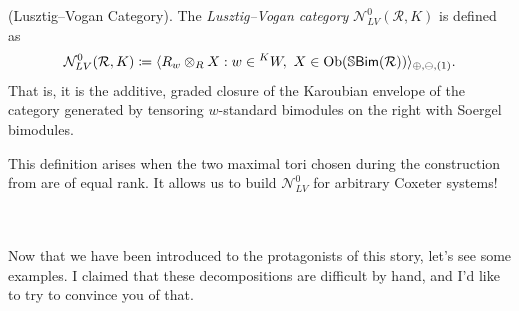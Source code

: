 \noindent\begin{definition}\textup{(Lusztig--Vogan Category).} The {\em Lusztig--Vogan category} $\mathcal{N}_{LV}^0(\mathcal{R}, K)$ is defined as
\begin{align*}
\begin{split}
\mathcal{N}_{LV}^0(\mathcal{R}, K) \coloneqq \langle R_w \otimes_R X : w \in {}^KW,\ X \in \textup{Ob}(\mathbb{S}\textup{\textsf{Bim}}(\mathcal{R}))\rangle_{\oplus,\ominus,(1)}.
\end{split}
\end{align*}
\noindent That is, it is the additive, graded closure of the Karoubian envelope of the category generated by tensoring $w$-standard bimodules on the right with Soergel bimodules.\\
\end{definition}

\noindent\begin{remark} This definition arises when the two maximal tori chosen during the construction from \cite{LR22} are of equal rank. It allows us to build $\mathcal{N}_{LV}^0$ for arbitrary Coxeter systems!\\\\
\end{remark}

\noindent\\ Now that we have been introduced to the protagonists of this story, let's see some examples. I claimed that these decompositions are difficult by hand, and I'd like to try to convince you of that.\newpage

